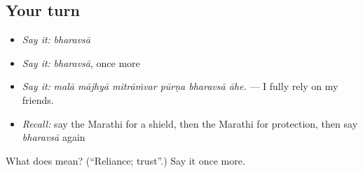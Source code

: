 \subsection*{Your turn}
\begin{itemize}
\raggedright
  \item \emph{Say it:} \emph{bharavsā}
  \item \emph{Say it:} \emph{bharavsā}, once more
  \item \emph{Say it:} \emph{malā mājhyā mitrāṁvar pūrṇa bharavsā āhe.} — I fully rely on my friends.
  \item \emph{Recall:} say the Marathi for a shield, then the Marathi for protection, then say \emph{bharavsā} again
\end{itemize}

\begin{tcolorbox}[breakable,colback=teal!4,colframe=teal!35!black,title={Before you move on}]
What does  mean? (\textquotedblleft{}Reliance; trust\textquotedblright{}.) Say it once more.
\end{tcolorbox}
